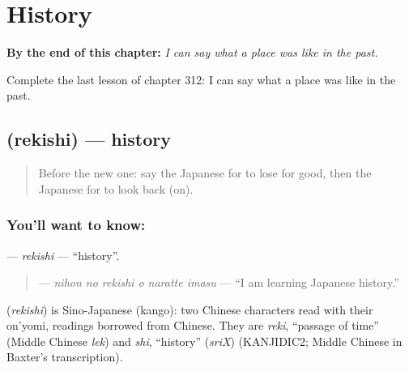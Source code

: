 
\chapter{History}
\label{ch:ja-history}

\begin{chapteropening}
\textbf{By the end of this chapter:} \emph{I can say what a place was like in the past.}

Complete the last lesson of chapter 312: I can say what a place was like in the past.
\end{chapteropening}

\section[\texorpdfstring{\ja{れきし} (rekishi)}{れきし (rekishi)}]{ (rekishi) — history}

\label{lesson:JA-C312-rekishi}



\begin{quote}
Before the new one: say the Japanese for to lose for good, then the Japanese for to look back (on).
\end{quote}

\subsection*{You'll want to know: }
\textbf{} — \emph{rekishi} — \textquotedblleft{}history\textquotedblright{}.

\begin{quote}
\textbf{  } — \emph{nihon no rekishi o naratte imasu} — \textquotedblleft{}I am learning Japanese history.\textquotedblright{}
\end{quote}

\begin{cousinweb}
\textbf{} (\emph{rekishi}) is Sino-Japanese (kango): two Chinese characters read with their on'yomi, readings borrowed from Chinese. They are \emph{reki}, \textquotedblleft{}passage of time\textquotedblright{} (Middle Chinese \emph{lek}) and \emph{shi}, \textquotedblleft{}history\textquotedblright{} (\emph{sriX}) (KANJIDIC2; Middle Chinese in Baxter's transcription).
\end{cousinweb}

